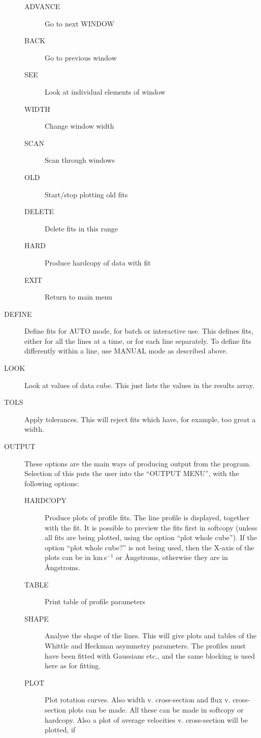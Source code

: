 \begin{description}
\begin{description}
\item[ADVANCE] Go to next WINDOW
\item[BACK] Go to previous window
\item[SEE] Look at individual elements of window
\item[WIDTH] Change window width
\item[SCAN] Scan through windows
\item[OLD] Start/stop plotting old fits
\item[DELETE] Delete fits in this range
\item[HARD] Produce hardcopy of data with fit
\item[EXIT] Return to main menu
\end{description}
\item[DEFINE] Define fits for AUTO mode, for batch or interactive use.
This defines fits, either for all the lines at a time, or for each line
separately.
To define fits differently within a line, use MANUAL mode as described
above.
\item[LOOK] Look at values of data cube.
This just lists the values in the results array.
\item[TOLS] Apply tolerances.
This will reject fits which have, for example, too great a width.
\item[OUTPUT] These options are the main ways of producing output
from the program.
Selection of this puts the user into the ``OUTPUT MENU'', with the
following options:\\
\begin{description}
\item[HARDCOPY] Produce plots of profile fits.
The line profile is displayed, together with the fit.
It is possible to preview the fits first in softcopy (unless all fits
are being plotted, using the option ``plot whole cube'').
If the option ``plot whole cube?'' is not being used, then the X-axis of
the plots can be in km\,s$^{-1}$ or {\AA}ngstroms, otherwise they are in
{\AA}ngstroms.
\item[TABLE] Print table of profile parameters
\item[SHAPE] Analyse the shape of the lines.
This will give plots and tables of the Whittle and Heckman asymmetry
parameters.
The profiles must have been fitted with Gaussians etc., and the same
blocking is used here as for fitting.
\item[PLOT] Plot rotation curves.
Also width v. cross-section and flux v. cross-section plots can be made.
All these can be made in softcopy or hardcopy.
Also a plot of average velocities v. cross-section will be plotted, if

\end{description}
\end{description}
